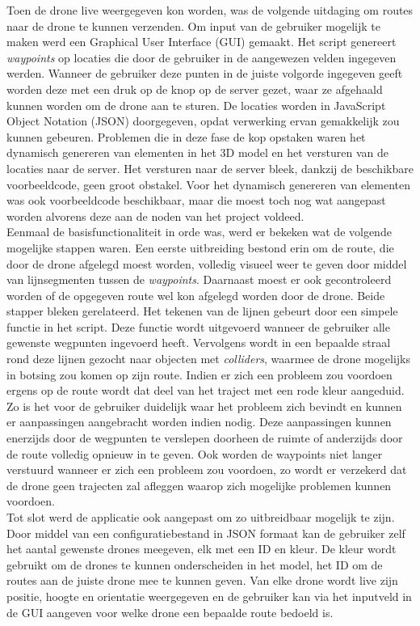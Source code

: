 Toen de drone live weergegeven kon worden, was de volgende uitdaging om routes naar de drone te kunnen verzenden.
Om input van de gebruiker mogelijk te maken werd een Graphical User Interface (GUI) gemaakt.
Het script genereert \textit{waypoints} op locaties die door de gebruiker in de aangewezen velden ingegeven werden.
Wanneer de gebruiker deze punten in de juiste volgorde ingegeven geeft worden deze met een druk op de knop op de server gezet, waar ze afgehaald kunnen worden om de drone aan te sturen.
De locaties worden in JavaScript Object Notation (JSON) doorgegeven, opdat verwerking ervan gemakkelijk zou kunnen gebeuren.
Problemen die in deze fase de kop opstaken waren het dynamisch genereren van elementen in het 3D model en het versturen van de locaties naar de server.
Het versturen naar de server bleek, dankzij de beschikbare voorbeeldcode, geen groot obstakel.
Voor het dynamisch genereren van elementen was ook voorbeeldcode beschikbaar, maar die moest toch nog wat aangepast worden alvorens deze aan de noden van het project voldeed.\\

Eenmaal de basisfunctionaliteit in orde was, werd er bekeken wat de volgende mogelijke stappen waren.
Een eerste uitbreiding bestond erin om de route, die door de drone afgelegd moest worden, volledig visueel weer te geven door middel van lijnsegmenten tussen de \textit{waypoints}.
Daarnaast moest er ook gecontroleerd worden of de opgegeven route wel kon afgelegd worden door de drone.
Beide stapper bleken gerelateerd.
Het tekenen van de lijnen gebeurt door een simpele functie in het script.
Deze functie wordt uitgevoerd wanneer de gebruiker alle gewenste wegpunten ingevoerd heeft.
Vervolgens wordt in een bepaalde straal rond deze lijnen gezocht naar objecten met \textit{colliders}, waarmee de drone mogelijks in botsing zou komen op zijn route.
Indien er zich een probleem zou voordoen ergens op de route wordt dat deel van het traject met een rode kleur aangeduid.
Zo is het voor de gebruiker duidelijk waar het probleem zich bevindt en kunnen er aanpassingen aangebracht worden indien nodig.
Deze aanpassingen kunnen enerzijds door de wegpunten te verslepen doorheen de ruimte of anderzijds door de route volledig opnieuw in te geven.
Ook worden de waypoints niet langer verstuurd wanneer er zich een probleem zou voordoen, zo wordt er verzekerd dat de drone geen trajecten zal afleggen waarop zich mogelijke problemen kunnen voordoen.\\

Tot slot werd de applicatie ook aangepast om zo uitbreidbaar mogelijk te zijn.
Door middel van een configuratiebestand in JSON formaat kan de gebruiker zelf het aantal gewenste drones meegeven, elk met een ID en kleur.
De kleur wordt gebruikt om de drones te kunnen onderscheiden in het model, het ID om de routes aan de juiste drone mee te kunnen geven.
Van elke drone wordt live zijn positie, hoogte en orientatie weergegeven en de gebruiker kan via het inputveld in de GUI aangeven voor welke drone een bepaalde route bedoeld is.